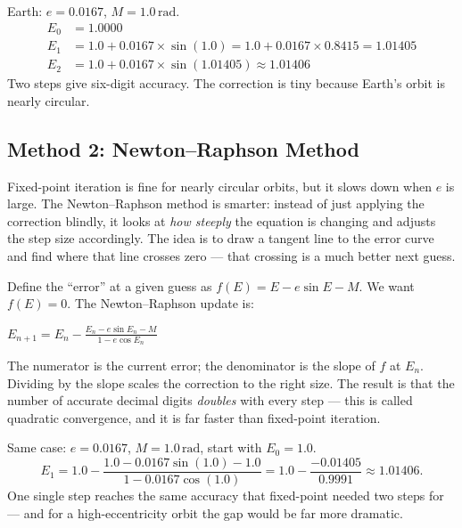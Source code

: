 \documentclass[12pt]{article}
\newenvironment{keyeq}{%
  \begin{tcolorbox}[
    enhanced, colback=blue!4!white, colframe=deepblue,
    boxrule=0.8pt, arc=4pt
  ]\centering
}{\end{tcolorbox}}
\newenvironment{notebox}[1]{%
  \begin{tcolorbox}[
    enhanced, breakable,
    colback=blue!3!white, colframe=deepblue,
    boxrule=0.7pt, arc=4pt,
    title={\bfseries #1}
  ]
}{\end{tcolorbox}}
\begin{document}
\begin{notebox}{Quick Example --- Fixed-Point}
Earth: $e = 0.0167$, $M = 1.0\,\text{rad}$.
\begin{align*}
  E_0 &= 1.0000 \\
  E_1 &= 1.0 + 0.0167 \times \sin(1.0) = 1.0 + 0.0167 \times 0.8415 = 1.01405 \\
  E_2 &= 1.0 + 0.0167 \times \sin(1.01405) \approx 1.01406
\end{align*}
Two steps give six-digit accuracy. The correction is tiny because Earth's orbit is
nearly circular.
\end{notebox}

\subsection{Method 2: Newton--Raphson Method}

Fixed-point iteration is fine for nearly circular orbits, but it slows down when $e$
is large. The Newton--Raphson method is smarter: instead of just applying the
correction blindly, it looks at \emph{how steeply} the equation is changing and
adjusts the step size accordingly. The idea is to draw a tangent line to the error
curve and find where that line crosses zero --- that crossing is a much better next
guess.

Define the ``error'' at a given guess as $f(E) = E - e\sin E - M$. We want $f(E) = 0$.
The Newton--Raphson update is:

\begin{keyeq}
  $\displaystyle E_{n+1} = E_n - \frac{E_n - e\sin E_n - M}{1 - e\cos E_n}$
\end{keyeq}

The numerator is the current error; the denominator is the slope of $f$ at $E_n$.
Dividing by the slope scales the correction to the right size. The result is that
the number of accurate decimal digits \emph{doubles} with every step --- this is
called quadratic convergence, and it is far faster than fixed-point iteration.

\begin{notebox}{Quick Example --- Newton--Raphson}
Same case: $e = 0.0167$, $M = 1.0\,\text{rad}$, start with $E_0 = 1.0$.
\[
  E_1 = 1.0 - \frac{1.0 - 0.0167\sin(1.0) - 1.0}{1 - 0.0167\cos(1.0)}
      = 1.0 - \frac{-0.01405}{0.9991} \approx 1.01406.
\]
One single step reaches the same accuracy that fixed-point needed two steps for ---
and for a high-eccentricity orbit the gap would be far more dramatic.
\end{notebox}
\end{document}
